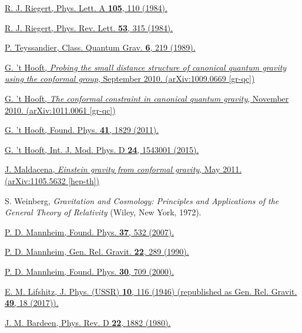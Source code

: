 \documentclass[aps]{revtex4}
\begin{document}
\begin{thebibliography}{99}
  
  \href{https://doi.org/10.1016/0375-9601(84)90648-0}{R. J. Riegert, Phys. Lett. A {\bf 105}, 110 (1984).}
  
 \href{https://doi.org/10.1103/PhysRevLett.53.315}{R. J. Riegert, Phys. Rev. Lett. {\bf 53}, 315 (1984).}

 \href{https://doi.org/10.1088/0264-9381/6/2/016}{P. Teyssandier, Class. Quantum Grav. {\bf 6}, 219 (1989).}


 \href{https://arxiv.org/abs/1009.0669}{G. 't Hooft,  {\it Probing the small distance structure of canonical quantum gravity using the conformal group}, September 2010. (arXiv:1009.0669 [gr-qc])}

  \href{https://arxiv.org/abs/1011.0061}{G. 't Hooft,  {\it The conformal constraint in canonical quantum gravity}, November 2010. (arXiv:1011.0061 [gr-qc])}


 \href{https://doi.org/10.1007/s10701-011-9586-8}{G. 't Hooft,  Found. Phys. {\bf 41}, 1829 (2011).}

 \href{https://doi.org/10.1142/S0218271815430014}{G. 't Hooft, Int. J. Mod. Phys. D {\bf 24}, 1543001 (2015).} 

  \href{https://arxiv.org/abs/1105.5632}{J. Maldacena, {\it Einstein gravity from conformal gravity}, May 2011. (arXiv:1105.5632 [hep-th])}

 S. Weinberg, {\it Gravitation and Cosmology:
Principles  and Applications of the General Theory of Relativity} 
(Wiley, New York, 1972).
 
  \href{https://doi.org/10.1007/s10701-007-9119-7}{P. D. Mannheim, Found. Phys. {\bf 37}, 532 (2007).}

 \href{https://doi.org/10.1007/BF00756278}{P. D. Mannheim, Gen. Rel. Gravit. {\bf 22}, 289 (1990).}

 \href{https://doi.org/10.1023/A:1003737011054}{P. D. Mannheim, Found. Phys. {\bf 30}, 709 (2000).}

 \href{https://doi.org/10.1007/s10714-016-2165-8}{E. M. Lifshitz, J. Phys. (USSR) {\bf 10}, 116 (1946) (republished as Gen. Rel. Gravit. \textbf{49}, 18  (2017)).}

 \href{https://doi.org/10.1103/PhysRevD.22.1882}{J. M. Bardeen, Phys. Rev. D \textbf{22}, 1882 (1980).}


\end{thebibliography}
\end{document}
